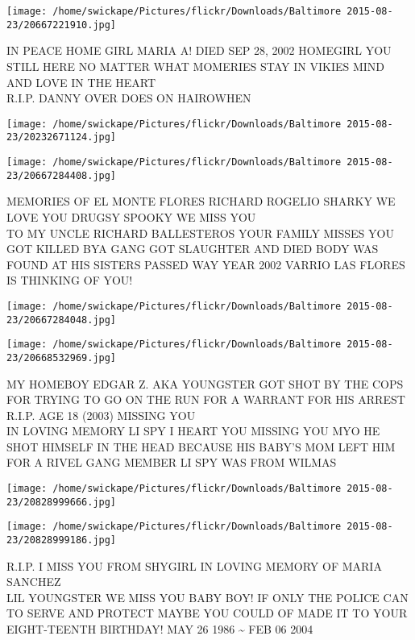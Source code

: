 \documentclass[10pt,letterpaper]{article}
\begin{document}
\vspace{0.25in}
\texttt{[image: /home/swickape/Pictures/flickr/Downloads/Baltimore 2015-08-23/20667221910.jpg]}

IN PEACE HOME GIRL MARIA A!  DIED SEP 28, 2002 HOMEGIRL YOU STILL HERE NO MATTER WHAT MOMERIES STAY IN VIKIES MIND AND LOVE IN THE HEART\\
R.I.P. DANNY OVER DOES ON HAIROWHEN\\
\pagebreak

\texttt{[image: /home/swickape/Pictures/flickr/Downloads/Baltimore 2015-08-23/20232671124.jpg]}

\vspace{0.25in}
\texttt{[image: /home/swickape/Pictures/flickr/Downloads/Baltimore 2015-08-23/20667284408.jpg]}

MEMORIES OF EL MONTE FLORES RICHARD ROGELIO SHARKY WE LOVE YOU DRUGSY SPOOKY WE MISS YOU\\
TO MY UNCLE RICHARD BALLESTEROS YOUR FAMILY MISSES YOU GOT KILLED BYA GANG GOT SLAUGHTER AND DIED BODY WAS FOUND AT HIS SISTERS PASSED WAY YEAR 2002 VARRIO LAS FLORES IS THINKING OF YOU!\\
\pagebreak

\texttt{[image: /home/swickape/Pictures/flickr/Downloads/Baltimore 2015-08-23/20667284048.jpg]}

\vspace{0.25in}
\texttt{[image: /home/swickape/Pictures/flickr/Downloads/Baltimore 2015-08-23/20668532969.jpg]}

MY HOMEBOY EDGAR Z. AKA YOUNGSTER GOT SHOT BY THE COPS FOR TRYING TO GO ON THE RUN FOR A WARRANT FOR HIS ARREST R.I.P. AGE 18 (2003) MISSING YOU\\
IN LOVING MEMORY LI SPY I HEART YOU MISSING YOU MYO HE SHOT HIMSELF IN THE HEAD BECAUSE HIS BABY'S MOM LEFT HIM FOR A RIVEL GANG MEMBER LI SPY WAS FROM WILMAS\\
\pagebreak

\texttt{[image: /home/swickape/Pictures/flickr/Downloads/Baltimore 2015-08-23/20828999666.jpg]}

\vspace{0.25in}
\texttt{[image: /home/swickape/Pictures/flickr/Downloads/Baltimore 2015-08-23/20828999186.jpg]}

R.I.P. I MISS YOU FROM SHYGIRL IN LOVING MEMORY OF MARIA SANCHEZ\\
LIL YOUNGSTER WE MISS YOU BABY BOY!  IF ONLY THE POLICE CAN TO SERVE AND PROTECT MAYBE YOU COULD OF MADE IT TO YOUR EIGHT{-}TEENTH BIRTHDAY!  MAY 26 1986 \textasciitilde{} FEB 06 2004\\
\pagebreak
\end{document}

